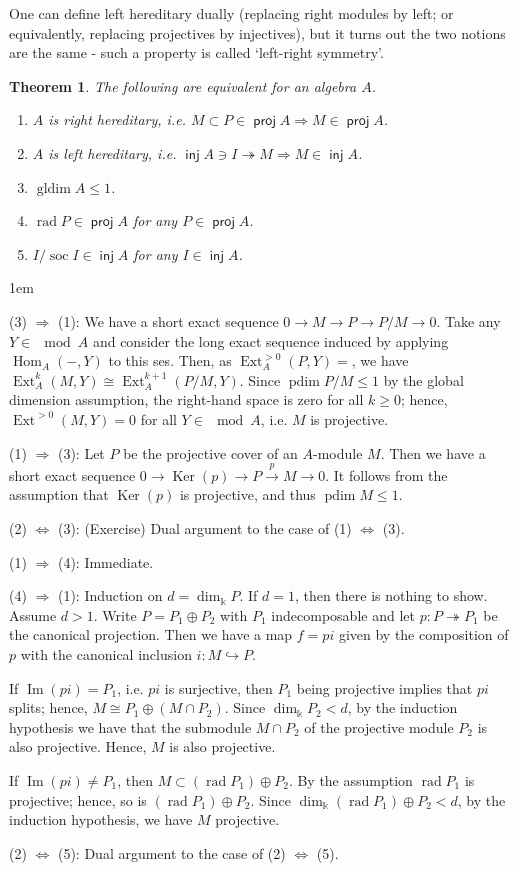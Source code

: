 \documentclass[11pt,a4paper]{article}
\makeatletter
\numberwithin{equation}{section}
\renewenvironment{proof}[1][\proofname]{\par
    \pushQED{\qed}%
    \normalfont \topsep0\p@\@plus6\p@ \labelsep1em\relax
    \trivlist
    \item[\hskip\labelsep\indent
        \bfseries #1]\ignorespaces
    \mbox{}
}{
    \popQED\endtrivlist\@endpefalse
}
\theoremstyle{all}
\newtheorem{theorem}{Theorem}[section]
\theoremstyle{remark}
\newcommand{\soc}{\operatorname{soc}\nolimits}
\newcommand{\rad}{\operatorname{rad}\nolimits}
\newcommand{\Ext}{\operatorname{Ext}\nolimits}
\newcommand{\Hom}{\operatorname{Hom}\nolimits}
\renewcommand{\Im}{\operatorname{Im}\nolimits}
\newcommand{\Ker}{\operatorname{Ker}\nolimits}
\DeclareMathOperator{\proj}{\mathsf{proj}}
\DeclareMathOperator{\inj}{\mathsf{inj}}
\newcommand{\pdim}{\operatorname{pdim}}
\newcommand{\gldim}{\operatorname{gldim}\nolimits}
\makeatother
\begin{document}
One can define left hereditary dually (replacing right modules by left; or equivalently, replacing projectives by injectives), but it turns out the two notions are the same - such a property is called `left-right symmetry'.

\begin{theorem}
The following are equivalent for an algebra $A$.
\begin{enumerate}
\item $A$ is right hereditary, i.e. $M\subset P\in\proj A \Rightarrow M\in\proj A$.
\item $A$ is left hereditary, i.e. $\inj A\ni I\twoheadrightarrow M \Rightarrow M\in\inj A$.
\item $\gldim A\leq 1$.
\item $\rad P\in\proj A$ for any $P\in\proj A$.
\item $I/\soc I \in \inj A$ for any $I\in\inj A$.
\end{enumerate}
\end{theorem}
\begin{proof}
(3) $\Rightarrow$ (1): We have a short exact sequence $0\to M\to P\to P/M\to 0$.  Take any $Y\in\mod A$ and consider the long exact sequence induced by applying $\Hom_A(-,Y)$ to this ses.  Then, as $\Ext_A^{>0}(P,Y)=$, we have $\Ext_A^k(M,Y)\cong \Ext_A^{k+1}(P/M,Y)$.
Since $\pdim P/M\leq 1$ by the global dimension assumption, the right-hand space is zero for all $k\geq 0$; hence, $\Ext^{>0}(M,Y)=0$ for all $Y\in\mod A$, i.e. $M$ is projective.

(1) $\Rightarrow$ (3): Let $P$ be the projective cover of an $A$-module $M$.  Then we have a short exact sequence $0\to \Ker(p) \to P\xrightarrow{p} M\to 0$.  It follows from the assumption that $\Ker(p)$ is projective, and thus $\pdim M\leq 1$.

(2) $\Leftrightarrow$ (3):  (Exercise) Dual argument to the case of (1) $\Leftrightarrow$ (3).

(1) $\Rightarrow$ (4): Immediate.

(4) $\Rightarrow$ (1): Induction on $d=\dim_{\Bbbk} P$.  If $d=1$, then there is nothing to show.  Assume $d>1$.  Write $P=P_1\oplus P_2$ with $P_1$ indecomposable and let $p:P\twoheadrightarrow P_1$ be the canonical projection.  Then we have a map $f=pi$ given by the composition of $p$ with the canonical inclusion $i:M\hookrightarrow P$.

If $\Im (pi)=P_1$, i.e. $pi$ is surjective, then $P_1$ being projective implies that $pi$ splits; hence, $M\cong P_1\oplus (M\cap P_2)$.  Since $\dim_{\Bbbk}P_2<d$, by the induction hypothesis we have that the submodule $M\cap P_2$ of the projective module $P_2$ is also projective.  Hence, $M$ is also projective.

If $\Im(pi)\neq P_1$, then $M\subset (\rad P_1)\oplus P_2$.  By the assumption $\rad P_1$ is projective; hence, so is $(\rad P_1)\oplus P_2$.  Since $\dim_\Bbbk (\rad P_1)\oplus P_2 < d$, by the induction hypothesis, we have $M$ projective.

(2) $\Leftrightarrow$ (5): Dual argument to the case of (2) $\Leftrightarrow$ (5).
\end{proof}
\end{document}
